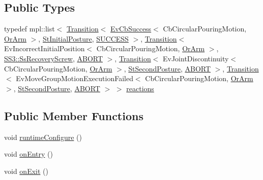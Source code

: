 \subsection*{Public Types}
\begin{DoxyCompactItemize}
\item 
typedef mpl\+::list$<$ \hyperlink{classsmacc_1_1Transition}{Transition}$<$ \hyperlink{structsmacc_1_1EvCbSuccess}{Ev\+Cb\+Success}$<$ Cb\+Circular\+Pouring\+Motion, \hyperlink{classsm__moveit__screw__loop_1_1OrArm}{Or\+Arm} $>$, \hyperlink{structsm__moveit__screw__loop_1_1StInitialPosture}{St\+Initial\+Posture}, \hyperlink{structsmacc_1_1default__transition__tags_1_1SUCCESS}{S\+U\+C\+C\+E\+SS} $>$, \hyperlink{classsmacc_1_1Transition}{Transition}$<$ Ev\+Incorrect\+Initial\+Position$<$ Cb\+Circular\+Pouring\+Motion, \hyperlink{classsm__moveit__screw__loop_1_1OrArm}{Or\+Arm} $>$, \hyperlink{structsm__moveit__screw__loop_1_1SS3_1_1SsRecoveryScrew}{S\+S3\+::\+Ss\+Recovery\+Screw}, \hyperlink{structsmacc_1_1default__transition__tags_1_1ABORT}{A\+B\+O\+RT} $>$, \hyperlink{classsmacc_1_1Transition}{Transition}$<$ Ev\+Joint\+Discontinuity$<$ Cb\+Circular\+Pouring\+Motion, \hyperlink{classsm__moveit__screw__loop_1_1OrArm}{Or\+Arm} $>$, \hyperlink{structsm__moveit__screw__loop_1_1StSecondPosture}{St\+Second\+Posture}, \hyperlink{structsmacc_1_1default__transition__tags_1_1ABORT}{A\+B\+O\+RT} $>$, \hyperlink{classsmacc_1_1Transition}{Transition}$<$ Ev\+Move\+Group\+Motion\+Execution\+Failed$<$ Cb\+Circular\+Pouring\+Motion, \hyperlink{classsm__moveit__screw__loop_1_1OrArm}{Or\+Arm} $>$, \hyperlink{structsm__moveit__screw__loop_1_1StSecondPosture}{St\+Second\+Posture}, \hyperlink{structsmacc_1_1default__transition__tags_1_1ABORT}{A\+B\+O\+RT} $>$ $>$ \hyperlink{structsm__moveit__screw__loop_1_1StSecondPosture_a15158038b73a3eb9e9f88bf60fa87e2d}{reactions}
\end{DoxyCompactItemize}
\subsection*{Public Member Functions}
\begin{DoxyCompactItemize}
\item 
void \hyperlink{structsm__moveit__screw__loop_1_1StSecondPosture_af6a1ca0635f3000eeaf9302a9aca1efa}{runtime\+Configure} ()
\item 
void \hyperlink{structsm__moveit__screw__loop_1_1StSecondPosture_aa8f8702818aff4bba59cd992165b0d0e}{on\+Entry} ()
\item 
void \hyperlink{structsm__moveit__screw__loop_1_1StSecondPosture_a19240afdfde0f7e7a99a40fef6a76b01}{on\+Exit} ()
\end{DoxyCompactItemize}
